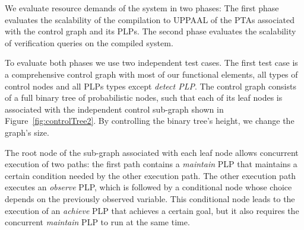 \documentclass[letterpaper]{article}
\begin{document}
We evaluate resource demands of the system 
in two phases: The first phase evaluates 
the scalability of the compilation to UPPAAL of the  PTAs associated
with the control graph and its PLPs.
The second phase evaluates the scalability of 
verification queries on the
compiled system.

To evaluate 
both phases we use two independent test cases.
The first test case is a comprehensive control graph
with most of our functional elements, all types of control nodes and all PLPs types except {\em detect PLP}. The control graph 
consists of a full binary tree of probabilistic nodes, such that
each of its leaf nodes 
is associated with the independent control sub-graph shown in Figure~\ref{fig:controlTree2}. 
By controlling the binary tree's height,
we  change the graph's size.


The root node of the sub-graph associated with each leaf node
allows concurrent execution of two paths: the first path contains a {\em maintain} PLP that maintains a certain condition needed by the other execution path. The other execution path
executes an {\em observe} PLP, which is followed by a conditional node whose choice depends
on the previously observed variable. This conditional node leads to the execution of an {\em achieve} PLP that achieves a certain goal, but it also requires the concurrent {\em maintain} PLP to run at the same time. 
\end{document}
